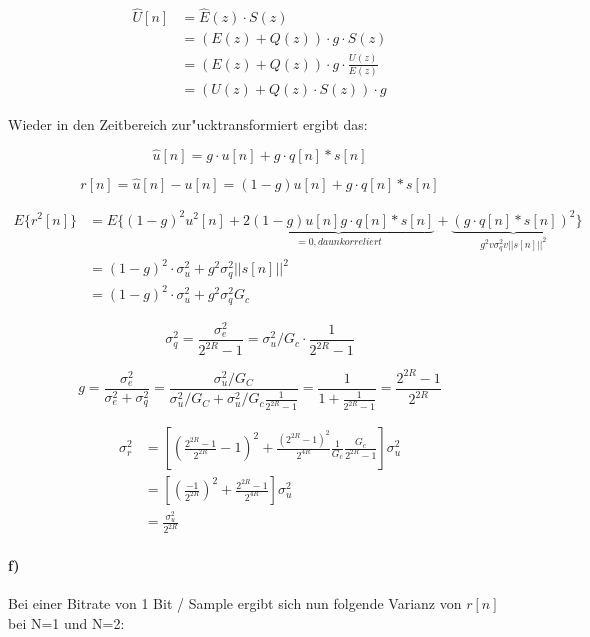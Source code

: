 \begin{align}
\hat{U}[n] &= \hat{E}(z) \cdot S(z)\\
 &= (E(z) + Q(z)) \cdot g \cdot S(z) \\
 &= (E(z) + Q(z)) \cdot g \cdot \frac{U(z)}{E(z)}  \\
 &= (U(z) + Q(z) \cdot S(z)) \cdot g
\end{align}

Wieder in den Zeitbereich zur"ucktransformiert ergibt das:

\begin{equation}
 \hat{u}[n] = g \cdot u[n] + g \cdot q[n] * s[n]
\end{equation}

\begin{equation}
 r[n] = \hat{u}[n] - u[n] = (1-g)u[n] + g \cdot q[n] * s[n]
\end{equation}

\begin{align}
 E\{r^2[n]\} &= E\{(1-g)^2 u^2[n] + \underbrace{2(1-g)u[n]g\cdot q[n] * s[n]}_{=0, da unkorreliert} + \underbrace{(g \cdot q[n]*s[n])^2}_{g^2v\sigma_q^2v||s[n]||^2}\} \\
 &= (1-g)^2 \cdot \sigma_u^2 + g^2\sigma_q^2 ||s[n]||^2 \\
 &= (1-g)^2 \cdot \sigma_u^2 + g^2\sigma_q^2 G_c
\end{align}


\begin{equation}
 \sigma_q^2 = \frac{\sigma_e^2}{2^{2R}-1} = \sigma_u^2/G_c \cdot \frac{1}{2^{2R}-1}
\end{equation}


\begin{equation}
 g = \frac{\sigma_e^2}{\sigma_e^2 + \sigma_q^2} = \frac{\sigma_u^2/G_C}{\sigma_u^2/G_C + \sigma_u^2/G_c\frac{1}{2^{2R}-1}}
 = \frac{1}{1+\frac{1}{2^{2R}-1}} = \frac{2^{2R} - 1}{2^{2R}}
\end{equation}

\begin{align}
 \sigma_r^2 &= [(\frac{2^{2R} - 1}{2^{2R}} - 1)^2 + \frac{(2^{2R} - 1)^2}{2^{4R}} \frac{1}{G_c} \frac{G_c}{2^{2R} - 1}]\sigma_u^2 \\
 &= [(\frac{-1}{2^{2R}})^2 +  \frac{2^{2R} - 1}{2^{4R}}]\sigma_u^2 \\
 &= \frac{\sigma_u^2}{2^{2R}}
\end{align}


\paragraph{f)}
Bei einer Bitrate von 1 Bit / Sample ergibt sich nun folgende Varianz von $r[n]$ bei N=1 und N=2:

